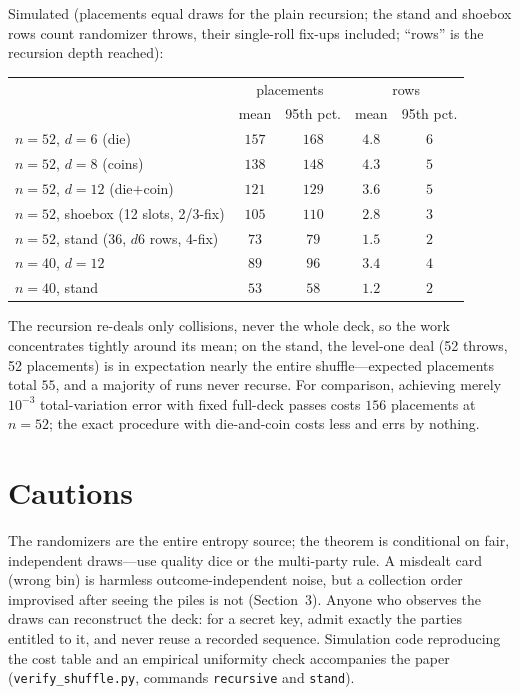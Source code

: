 \documentclass[11pt]{article}
\begin{document}
Simulated (placements equal draws for the plain recursion; the stand
and shoebox rows count randomizer throws, their single-roll fix-ups
included; ``rows'' is the recursion depth reached):

\begin{center}
\begin{tabular}{lcccc}
\toprule
 & \multicolumn{2}{c}{placements} & \multicolumn{2}{c}{rows} \\
 & mean & 95th pct. & mean & 95th pct. \\
\midrule
$n=52$, $d=6$ (die)          & $157$ & $168$ & $4.8$ & $6$ \\
$n=52$, $d=8$ (coins)        & $138$ & $148$ & $4.3$ & $5$ \\
$n=52$, $d=12$ (die$+$coin)  & $121$ & $129$ & $3.6$ & $5$ \\
$n=52$, shoebox (12 slots, 2/3-fix) & $105$ & $110$ & $2.8$ & $3$ \\
$n=52$, stand (36, $d6$ rows, 4-fix) & $73$  & $79$  & $1.5$ & $2$ \\
$n=40$, $d=12$               & $89$  & $96$  & $3.4$ & $4$ \\
$n=40$, stand                & $53$  & $58$  & $1.2$ & $2$ \\
\bottomrule
\end{tabular}
\end{center}

The recursion re-deals only collisions, never the whole deck, so the
work concentrates tightly around its mean; on the stand, the level-one
deal (52 throws, 52 placements) is in expectation nearly the entire
shuffle---expected placements total $55$, and a majority of runs never
recurse. For comparison, achieving
merely $10^{-3}$ total-variation error with fixed full-deck passes costs
$156$ placements at $n = 52$; the exact procedure with die-and-coin
costs less and errs by nothing.

\section{Cautions}

The randomizers are the entire entropy source; the theorem is
conditional on fair, independent draws---use quality dice or the
multi-party rule. A misdealt card (wrong bin) is harmless
outcome-independent noise, but a collection order improvised after
seeing the piles is not (Section~3). Anyone who observes the draws can
reconstruct the deck: for a secret key, admit exactly the parties
entitled to it, and never reuse a recorded sequence. Simulation code
reproducing the cost table and an empirical uniformity check accompanies
the paper (\texttt{verify\_shuffle.py}, commands \texttt{recursive} and \texttt{stand}).
\end{document}
